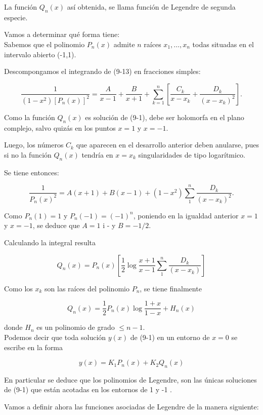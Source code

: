 \documentclass[10pt]{article}
\theoremstyle{plain}
\theoremstyle{definition}
\theoremstyle{remark}
\begin{document}
La función $Q_{n}(x)$ así obtenida, se llama función de Legendre de segunda especie.

Vamos a determinar qué forma tiene:\\
Sabemos que el polinomio $P_{n}(x)$ admite $n$ raíces $x_{1}, \ldots, x_{n}$ todas situadas en el intervalo abierto (-1,1).

Descompongamos el integrando de (9-13) en fracciones simples:

$$
\frac{1}{\left(1-x^{2}\right)\left[P_{n}(x)\right]^{2}}=\frac{A}{x-1}+\frac{B}{x+1}+\sum_{k=1}^{n}\left[\frac{C_{k}}{x-x_{k}}+\frac{D_{k}}{\left(x-x_{k}\right)^{2}}\right] .
$$

Como la función $Q_{n}(x)$ es solución de (9-1), debe ser holomorfa en el plano complejo, salvo quizás en los puntos $x=1$ y $x=-1$.

Luego, los números $C_{k}$ que aparecen en el desarrollo anterior deben anularse, pues si no la función $Q_{n}(x)$ tendría en $x=x_{k}$ singularidades de tipo logarítmico.

Se tiene entonces:

$$
\frac{1}{P_{n}(x)^{2}}=A(x+1)+B(x-1)+\left(1-x^{2}\right) \sum_{1}^{n} \frac{D_{k}}{\left(x-x_{k}\right)^{2}} .
$$

Como $P_{n}(1)=1$ y $P_{n}(-1)=(-1)^{n}$, poniendo en la igualdad anterior $x=1$ y $x=-1$, se deduce que $A=1$ i - y $B=-1 / 2$.

Calculando la integral resulta

$$
Q_{n}(x)=P_{n}(x)\left[\frac{1}{2} \log \frac{x+1}{x-1} \sum_{1}^{n} \frac{D_{k}}{\left(x-x_{k}\right)}\right]
$$

Como los $x_{k}$ son las raíces del polinomio $P_{n}$, se tiene finalmente


\begin{equation*}
Q_{n}(x)=\frac{1}{2} P_{n}(x) \log \frac{1+x}{1-x}+H_{n}(x) \tag{9-14}
\end{equation*}


donde $H_{n}$ es un polinomio de grado $\leqslant n-1$.\\
Podemos decir que toda solución $y(x)$ de (9-1) en un entorno de $x=0$ se escribe en la forma

$$
y(x)=K_{1} P_{n}(x)+K_{2} Q_{n}(x)
$$

En particular se deduce que los polinomios de Legendre, son las únicas soluciones de (9-1) que están acotadas en los entornos de 1 y -1 .

Vamos a definir ahora las funciones asociadas de Legendre de la manera siguiente:
\end{document}
